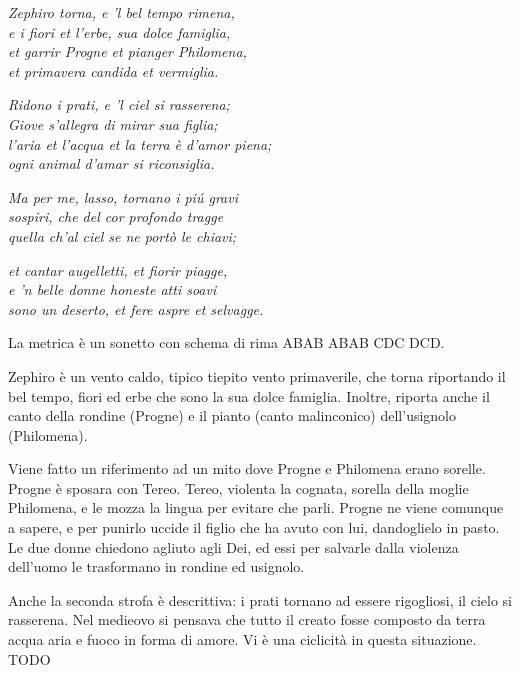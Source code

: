 \documentclass[a4paper]{article}
\begin{document}
\begin{center}
    \textit{Zephiro torna, e 'l bel tempo rimena,} \\
    \textit{e i fiori et l'erbe, sua dolce famiglia,} \\
    \textit{et garrir Progne et pianger Philomena,} \\
    \textit{et primavera candida et vermiglia.}
\end{center}
\begin{center}
    \textit{Ridono i prati, e 'l ciel si rasserena;} \\
    \textit{Giove s'allegra di mirar sua figlia;} \\
    \textit{l'aria et l'acqua et la terra è d'amor piena;} \\
    \textit{ogni animal d'amar si riconsiglia.}
\end{center}
\begin{center}
    \textit{Ma per me, lasso, tornano i piú gravi} \\
    \textit{sospiri, che del cor profondo tragge} \\
    \textit{quella ch'al ciel se ne portò le chiavi;}
\end{center}
\begin{center}
    \textit{et cantar augelletti, et fiorir piagge,} \\
    \textit{e 'n belle donne honeste atti soavi} \\
    \textit{sono un deserto, et fere aspre et selvagge.}
\end{center}

La metrica è un sonetto con schema di rima ABAB ABAB CDC DCD.

Zephiro è un vento caldo, tipico tiepito vento primaverile,
che torna riportando il bel tempo, fiori ed erbe che sono la sua dolce famiglia.
Inoltre, riporta anche il canto della rondine (Progne) e il pianto (canto malinconico)
dell'usignolo (Philomena).

Viene fatto un riferimento ad un mito dove Progne e Philomena erano sorelle.
Progne è sposara con Tereo. Tereo, violenta la cognata, sorella della moglie Philomena,
e le mozza la lingua per evitare che parli. Progne ne viene comunque a sapere,
e per punirlo uccide il figlio che ha avuto con lui, dandoglielo in pasto.
Le due donne chiedono agliuto agli Dei, ed essi per salvarle dalla violenza dell'uomo
le trasformano in rondine ed usignolo.

Anche la seconda strofa è descrittiva: i prati tornano ad essere rigogliosi, il cielo
si rasserena.
Nel medieovo si pensava che tutto il creato fosse composto da terra
acqua aria e fuoco in forma di amore.
Vi è una ciclicità in questa situazione.
TODO
\end{document}
